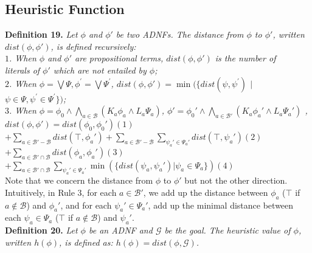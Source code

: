 \documentclass{llncs}
\begin{document}
\subsection{Heuristic Function}
\textbf{Definition 19.} \textit{Let $\phi$ and $\phi'$ be two ADNFs. The distance from $\phi$ to $\phi'$, written $dist(\phi, \phi')$, is defined recursively:\\
\hspace*{0.1in} $1$. When $\phi$ and $\phi'$ are propositional terms, $dist(\phi, \phi')$ is the number of \\\hspace*{0.3in} literals of $\phi'$ which are not entailed by $\phi$;\\
\hspace*{0.1in} $2$. When $\phi=\bigvee\Psi, \phi^\prime=\bigvee\Psi^\prime$, $dist(\phi, \phi')=\min (\{dist(\psi, \psi^\prime)$ $|$ $\psi\in\Psi, \psi^\prime\in\Psi^\prime\})$;\\
\hspace*{0.1in} $3$. When $\phi=\phi_0\land\bigwedge_{a\in\mathcal{B}}(K_a\phi_a\land L_a\Psi_a)$, $\phi'=\phi_0'\land\bigwedge_{a\in\mathcal{B}'}(K_a\phi_a'\land L_a\Psi_a')$ ,\\
\hspace*{0.1in}\hspace{0.2in} $dist(\phi, \phi')$\quad$=$\quad$dist(\phi_0, \phi_0')$\hspace{2.6in}$(1)$\\
\hspace*{0.1in}\hspace{0.838in}\quad$+$\quad$\sum_{a\in\mathcal{B}'-\mathcal{B}}dist(\top, \phi_a')
   + \sum_{a\in\mathcal{B}'-\mathcal{B}}\sum_{\psi_a'\in\Psi_a'}dist(\top, \psi_a')$\hspace{0.13in}$(2)$\\
\hspace*{0.1in}\hspace{0.838in}\quad$+$\quad$\sum_{a\in\mathcal{B}'\cap\mathcal{B}}dist(\phi_a, \phi_a')$\hspace{2.03in}$(3)$\\
\hspace*{0.1in}\hspace{0.838in}\quad$+$\quad$\sum_{a\in\mathcal{B}'\cap\mathcal{B}}\sum_{\psi_a'\in\Psi_a'}
\min(\{dist(\psi_a,\psi_a')|\psi_a\in\Psi_a\})$\hspace{0.51in}$(4)$}\vspace{0.05in}\\
Note that we concern the distance from $\phi$ to $\phi'$ but not the other direction. Intuitively, in Rule 3, for each $a\in\mathcal{B}'$, we add up the distance between $\phi_a$ ($\top$ if $a\not\in\mathcal{B}$) and $\phi_a'$, and for each $\psi_a'\in\Psi_a'$, add up the minimal distance between each $\psi_a\in\Psi_a$ ($\top$ if $a\not\in\mathcal{B}$) and $\psi_a'$.\vspace{0.05in}\\
\textbf{Definition 20.} \textit{Let $\phi$ be an ADNF and $\mathcal{G}$ be the goal. The heuristic value of $\phi$, written $h(\phi)$, is defined as: $h(\phi)=dist(\phi, \mathcal{G})$.}
\end{document}
